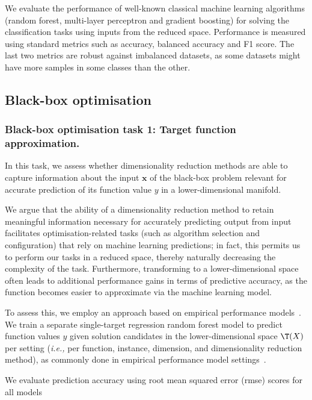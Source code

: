We evaluate the performance of well-known classical machine learning algorithms (random forest, multi-layer perceptron and gradient boosting) for solving the classification tasks using inputs from the reduced space.
Performance is measured using standard metrics such as accuracy, balanced accuracy and F1 score. The last two metrics are robust against imbalanced datasets, as some datasets might have more samples in some classes than the other.

\subsection{Black-box optimisation}

\subsubsection*{Black-box optimisation task 1: Target function approximation.}
\label{sec:ch04:method-bbo-task2}

In this task, we assess whether dimensionality reduction methods are able to capture information about the input $\mathbf{x}$ of the black-box problem relevant for accurate prediction of its function value $y$ in a lower-dimensional manifold.

We argue that the ability of a dimensionality reduction method to retain meaningful information necessary for accurately predicting output from input facilitates optimisation-related tasks (such as algorithm selection and configuration) that rely on machine learning predictions; in fact, this permits us to perform our tasks in a reduced space, thereby naturally decreasing the complexity of the task. 
Furthermore, transforming to a lower-dimensional space often leads to additional performance gains in terms of predictive accuracy, as the function becomes easier to approximate via the machine learning model. 





To assess this, we employ an approach based on empirical performance models~\citep{HutEtAl14}. 
We train a separate single-target regression random forest model to predict function values $y$ given solution candidates in the lower-dimensional space $\T(X)$ per setting (\emph{i.e.,} per function, instance, dimension, and dimensionality reduction method), as commonly done in empirical performance model settings~\citep{HutEtAl14,ShaHoo24}.

We evaluate prediction accuracy using root mean squared error (\gls{rmse}) scores for all models 


